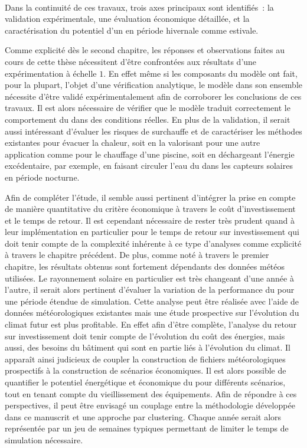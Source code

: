 \paragraph{} %
Dans la continuité de ces travaux, trois axes principaux sont identifiés~: la validation
expérimentale, une évaluation économique détaillée, et la caractérisation du potentiel
d’un  en période hivernale comme estivale.

Comme explicité dès le second chapitre, les réponses et observations faites au cours de
cette thèse nécessitent d’être confrontées aux résultats d’une expérimentation à échelle
$1$. En effet même si les composants du modèle ont fait, pour la plupart, l’objet d’une
vérification analytique, le modèle dans son ensemble nécessite d’être validé
expérimentalement afin de corroborer les conclusions de ces travaux. Il est alors
nécessaire de vérifier que le modèle traduit correctement le comportement du
 dans des conditions réelles.
En plus de la validation, il serait aussi intéressant d’évaluer les risques de surchauffe
et de caractériser les méthodes existantes pour évacuer la chaleur, soit en la valorisant
pour une autre application comme pour le chauffage d’une piscine, soit en déchargeant
l’énergie excédentaire, par exemple, en faisant circuler l’eau du  dans les
capteurs solaires en période nocturne.

Afin de compléter l’étude, il semble aussi pertinent d’intégrer la prise en compte de manière
quantitative du critère économique à travers le coût d’investissement et le temps de
retour. Il est cependant nécessaire de rester très prudent quand à leur implémentation en
particulier pour le temps de retour sur investissement qui doit tenir compte de la
complexité inhérente à ce type d’analyses comme explicité à travers le chapitre précédent.
De plus, comme noté à travers le premier chapitre, les résultats obtenus sont fortement
dépendants des données météos utilisées. Le rayonnement solaire en particulier est très
changeant d’une année à l’autre, il serait alors pertinent d’évaluer la variation de la
performance du  pour une période étendue de simulation. Cette analyse peut être
réalisée avec l’aide de données météorologiques existantes mais une étude prospective sur
l’évolution du climat futur est plus profitable. En effet afin d’être complète, l’analyse
du retour sur investissement doit tenir compte de l’évolution du coût des énergies, mais
aussi, des besoins du bâtiment qui sont en partie liés à l’évolution du climat. Il apparaît ainsi
judicieux de coupler la construction de fichiers météorologiques prospectifs à la
construction de scénarios économiques. Il est alors possible de quantifier le potentiel énergétique
et économique du  pour différents scénarios, tout en tenant compte du
vieillissement des équipements. Afin de répondre à ces perspectives, il peut être envisagé
un couplage entre la méthodologie développée dans ce manuscrit et une approche par clustering. Chaque
année serait alors représentée par un jeu de semaines typiques permettant de limiter le temps de
simulation nécessaire.

